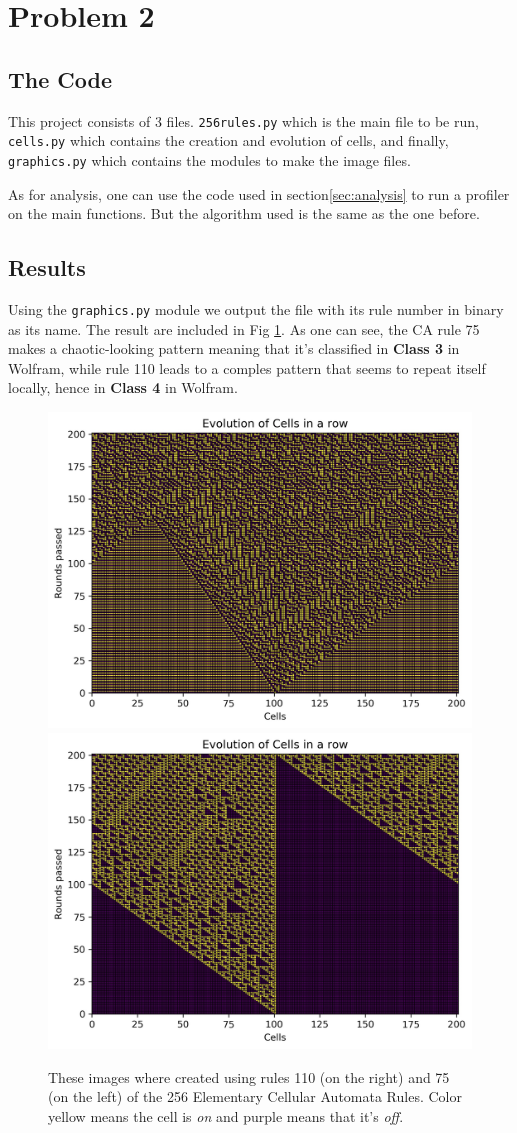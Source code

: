 \documentclass[12pt]{article}
\begin{document}
	\section{Problem 2}
	\subsection{The Code}
	This project consists of 3 files. \texttt{256rules.py} which is the main file to be run,
	\texttt{cells.py} which contains the creation and evolution of cells, and finally, \texttt{graphics.py} which contains the modules to make the image files.
	
	As for analysis, one can use the code used in section\ref{sec:analysis} to run a profiler on the main functions. But the algorithm used is the same as the one before.
	
	\subsection{Results}
	Using the \texttt{graphics.py} module we output the file with its rule number in binary as its name. The result are included in Fig \ref{fig:2rules}.   As one can see, the CA rule 75 makes a chaotic-looking pattern meaning that
	it's classified in \textbf{Class 3} in Wolfram, while rule 110 leads to a comples pattern that seems to repeat itself locally, hence in \textbf{Class 4} in Wolfram.
	\begin{figure}[h!]
		\includegraphics[width=0.45\linewidth]{../P2/Hats01001011.jpg}
		\includegraphics[width=0.45\linewidth]{../P2/Hats01101110.jpg}
		\label{fig:2rules}
		\caption{These images where created using rules 110 (on the right) and 75 (on the left)
							 of the 256 Elementary Cellular Automata Rules. Color yellow means the 
							 cell is \emph{on} and purple means that it's \emph{off}. }
	\end{figure}
	
\end{document}
